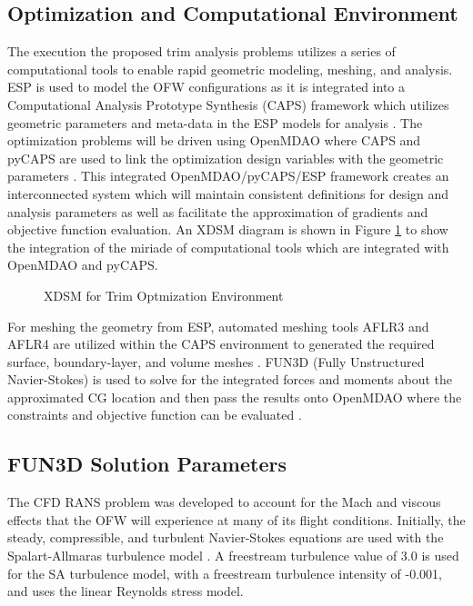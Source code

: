 \subsection{Optimization and Computational Environment}

The execution the proposed trim analysis problems utilizes a series of computational tools to enable rapid geometric modeling, meshing, and analysis.
ESP is used to model the OFW configurations as it is integrated into a Computational Analysis Prototype Synthesis (CAPS) framework which utilizes geometric parameters and meta-data in the ESP models for analysis \cite{EngSktPad, CAPScite}.
The optimization problems will be driven using OpenMDAO where CAPS and pyCAPS are used to link the optimization design variables with the geometric parameters \cite{pycaps, openmdao}.
This integrated OpenMDAO/pyCAPS/ESP framework creates an interconnected system which will maintain consistent definitions for design and analysis parameters as well as facilitate the approximation of gradients and objective function evaluation.
An XDSM diagram is shown in Figure \ref{fig:method:xdsm} to show the integration of the miriade of computational tools which are integrated with OpenMDAO and pyCAPS.

\begin{figure}[h]
  \centering
  
  \caption{XDSM for Trim Optmization Environment \cite{xdsm}}
  \label{fig:method:xdsm}
\end{figure}

For meshing the geometry from ESP, automated meshing tools AFLR3 and AFLR4 are utilized within the CAPS environment to generated the required surface, boundary-layer, and volume meshes \cite{aflr3, aflr4}.
FUN3D (Fully Unstructured Navier-Stokes) is used to solve for the integrated forces and moments about the approximated CG location and then pass the results onto OpenMDAO where the constraints and objective function can be evaluated \cite{fun3d}.

\subsection{FUN3D Solution Parameters}

The CFD RANS problem was developed to account for the Mach and viscous effects that the OFW will experience at many of its flight conditions.
Initially, the steady, compressible, and turbulent Navier-Stokes equations are used with the Spalart-Allmaras turbulence model \cite{spalartModel}.
A freestream turbulence value of 3.0 is used for the SA turbulence model, with a freestream turbulence intensity of -0.001, and uses the linear Reynolds stress model.

